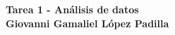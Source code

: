 \begin{center}
	\textbf{
		\textcolor{title}{Tarea 1 - Análisis de datos\\Giovanni Gamaliel López Padilla}}
\end{center}
